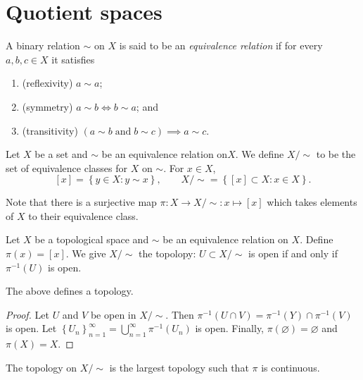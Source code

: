 \section{Quotient spaces}

\begin{definition}
	A binary relation ${\sim}$ on $X$ is said to be an
	\emph{equivalence relation} if for every $a,b,c \in X$
	it satisfies
	\begin{enumerate}
		\item (reflexivity) $a \sim a$;
		\item (symmetry) $a \sim b \iff b \sim a$; and
		\item (transitivity) 
			$(a \sim b \;\text{and}\; b \sim c) \implies a \sim c$.
	\end{enumerate}
\end{definition}

\begin{definition}
	Let $X$ be a set and $\sim$ be an equivalence relation on$X$.
	We define $X/{\sim}$ to be the set of equivalence classes for $X$
	on $\sim$.
	For $x \in X$,
	\[
		[x] = \left\{
			y \in X: y \sim x
		\right\}, \qquad
		X/{\sim} = \left\{
			[x] \subset X: x \in X
		\right\}.
	\]
\end{definition}

Note that there is a surjective map $\pi: X \to X/{\sim}: x \mapsto [x]$
which takes elements of $X$ to their equivalence class.

\begin{definition}[]
	Let $X$ be a topological space and $\sim$ be an equivalence relation on
	$X$.
	Define $\pi(x) = [x]$.
	We give $X/{\sim}$ the topolopy: $U \subset X/{\sim}$ is open
	if and only if $\pi^{-1}(U)$ is open.
\end{definition}

\begin{proposition}[]
	The above defines a topology.
\end{proposition}

\begin{proof}
	Let $U$ and $V$ be open in $X/{\sim}$.
	Then $\pi^{-1}(U \cap V) = \pi^{-1}(Y) \cap \pi^{-1}(V)$ is open.
	Let
	$
		\left\{
			U_n
		\right\}_{n=1}^\infty
		= \bigcup_{n=1}^\infty \pi^{-1}(U_n)
	$
	is open.
	Finally, $\pi(\varnothing) = \varnothing$
	and $\pi(X) = X$.
\end{proof}

\begin{proposition}[]
	The topology on $X/{\sim}$ is the largest topology such that
	$\pi$ is continuous.
\end{proposition}

